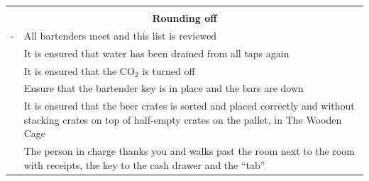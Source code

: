 \documentclass[a4paper,10pt,oneside,article]{memoir}
\begin{document}
\vspace{0.5cm}
\noindent
\begin{tabular}{|l|l|}
    \hline
    \multicolumn{2}{|c|}{} \\
    \multicolumn{2}{|c|}{\Large \textbf{Rounding off}} \\
    \hline
    \begin{minipage}[t]{0.15\textwidth}
        {\color{white}-}
    \end{minipage} & 
    \begin{minipage}[t]{0.80\textwidth}
        All bartenders meet and this list is reviewed
    \end{minipage} \\
    \hline
    \begin{minipage}[t]{0.15\textwidth}
    \end{minipage} & 
    \begin{minipage}[t]{0.80\textwidth}
        It is ensured that water has been drained from all taps again
    \end{minipage} \\
    \hline
    \begin{minipage}[t]{0.15\textwidth}
    \end{minipage} & 
    \begin{minipage}[t]{0.80\textwidth}
        It is ensured that the CO$_2$ is turned off
    \end{minipage} \\
    \hline
    \begin{minipage}[t]{0.15\textwidth}
    \end{minipage} & 
    \begin{minipage}[t]{0.80\textwidth}
        Ensure that the bartender key is in place and the bars are down
    \end{minipage} \\
    \hline
    \begin{minipage}[t]{0.15\textwidth}
    \end{minipage} & 
    \begin{minipage}[t]{0.80\textwidth}
        It is ensured that the beer crates is sorted and placed correctly and without stacking 
        crates on top of half-empty crates on the pallet, in The Wooden Cage
    \end{minipage} \\
    \hline
    \begin{minipage}[t]{0.15\textwidth}
    \end{minipage} & 
    \begin{minipage}[t]{0.80\textwidth}
        The person in charge thanks you and walks past the room next to the room 
        with receipts, the key to the cash drawer and the ``tab''
    \end{minipage} \\
    \hline
\end{tabular}

\vfill
\end{document}
